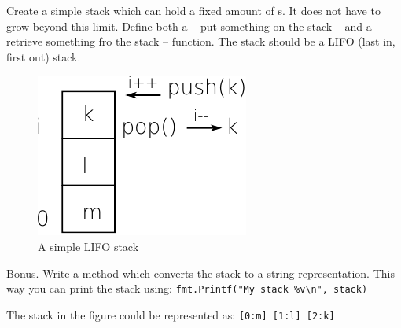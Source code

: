 \begin{Exercise}[title={Stack},difficulty=5]
\label{ex:stack}
\Question \label{ex:stack q1} Create a simple stack which can hold a
fixed amount of s. It does not have to grow beyond this limit.
Define both a  -- put something on the stack -- and a  
-- retrieve something fro the stack -- function. The stack should be
a LIFO (last in, first out) stack.

\begin{figure}[H]
\caption{A simple LIFO stack}
\label{fig:stack}
\begin{center}
\includegraphics[scale=0.65]{fig/stack.pdf}
\end{center}
\end{figure}

\Question \label{ex:stack q2} Bonus. Write a  method which 
converts the stack to a string representation.  This way you can print the stack using:
\lstinline{fmt.Printf("My stack %v\n", stack)}

\noindent{}The stack in the figure could be represented as:
\texttt{[0:m] [1:l] [2:k]}

\end{Exercise}

